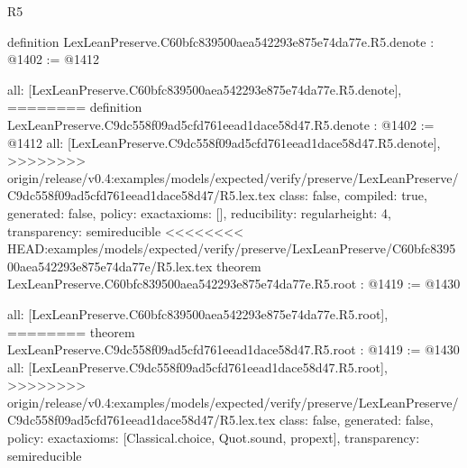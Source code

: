 \begin{lexlean}{R5}
\begin{coremodule}
{{{{{{{{{{{definition LexLeanPreserve.C60bfc839500aea542293e875e74da77e.R5.denote : @1402 := @1412 {
  all: [LexLeanPreserve.C60bfc839500aea542293e875e74da77e.R5.denote],
========
definition LexLeanPreserve.C9dc558f09ad5cfd761eead1dace58d47.R5.denote : @1402 := @1412 {
  all: [LexLeanPreserve.C9dc558f09ad5cfd761eead1dace58d47.R5.denote],
>>>>>>>> origin/release/v0.4:examples/models/expected/verify/preserve/LexLeanPreserve/C9dc558f09ad5cfd761eead1dace58d47/R5.lex.tex
  class: false,
  compiled: true,
  generated: false,
  policy: exact{axioms: []},
  reducibility: regular{height: 4},
  transparency: semireducible
}
<<<<<<<< HEAD:examples/models/expected/verify/preserve/LexLeanPreserve/C60bfc839500aea542293e875e74da77e/R5.lex.tex
theorem LexLeanPreserve.C60bfc839500aea542293e875e74da77e.R5.root : @1419 := @1430 {
  all: [LexLeanPreserve.C60bfc839500aea542293e875e74da77e.R5.root],
========
theorem LexLeanPreserve.C9dc558f09ad5cfd761eead1dace58d47.R5.root : @1419 := @1430 {
  all: [LexLeanPreserve.C9dc558f09ad5cfd761eead1dace58d47.R5.root],
>>>>>>>> origin/release/v0.4:examples/models/expected/verify/preserve/LexLeanPreserve/C9dc558f09ad5cfd761eead1dace58d47/R5.lex.tex
  class: false,
  generated: false,
  policy: exact{axioms: [Classical.choice, Quot.sound, propext]},
  transparency: semireducible
}

}}}}}}}}}}}}}
\end{coremodule}
\end{lexlean}
